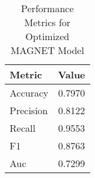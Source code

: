 \begin{table}[h]
\centering
\caption{Performance Metrics for Optimized MAGNET Model}
\label{tab:performance_metrics}
\begin{tabular}{lc}
\toprule
Metric & Value \\
\midrule
Accuracy & 0.7970 \\
Precision & 0.8122 \\
Recall & 0.9553 \\
F1 & 0.8763 \\
Auc & 0.7299 \\
\bottomrule
\end{tabular}
\end{table}
